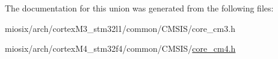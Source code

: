 The documentation for this union was generated from the following files\-:\begin{DoxyCompactItemize}
\item 
miosix/arch/cortex\-M3\-\_\-stm32l1/common/\-C\-M\-S\-I\-S/core\-\_\-cm3.\-h\item 
miosix/arch/cortex\-M4\-\_\-stm32f4/common/\-C\-M\-S\-I\-S/\hyperlink{core__cm4_8h}{core\-\_\-cm4.\-h}\end{DoxyCompactItemize}
